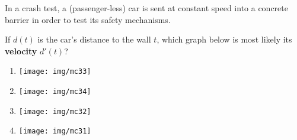 \item 
	In a crash test, a (passenger-less) car is sent at constant speed into a concrete barrier in order to test its safety mechanisms. 

If $d(t)$ is the car's distance to the wall $t$, which graph below is most likely its \textbf{velocity} $d'(t)$?

\begin{multicols}{2}
\begin{enumerate}\setlength{\itemsep}{.5cm}
	\item \begin{minipage}{.4\textwidth}
		\texttt{[image: img/mc33]}
	\end{minipage} %

	\item \begin{minipage}{.4\textwidth}
		\texttt{[image: img/mc34]}
	\end{minipage}

	\item \begin{minipage}{.4\textwidth}
		\texttt{[image: img/mc32]}
	\end{minipage}

	\item \begin{minipage}{.4\textwidth}
		\texttt{[image: img/mc31]}
	\end{minipage}
		
\end{enumerate}
 \end{multicols}



 
